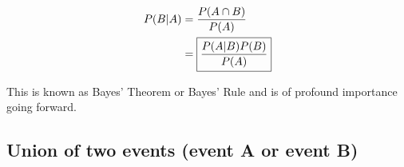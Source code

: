 \begin{align}
  P(B|A) &= {P(A \cap B)\over P(A)}\\
         &= \boxed{{P(A|B) P(B) \over P(A)}}
\end{align}



This is known as Bayes' Theorem or Bayes' Rule and is of profound
importance going forward.



\subsection*{Union of two events (event A \textbf{or} event B)}
